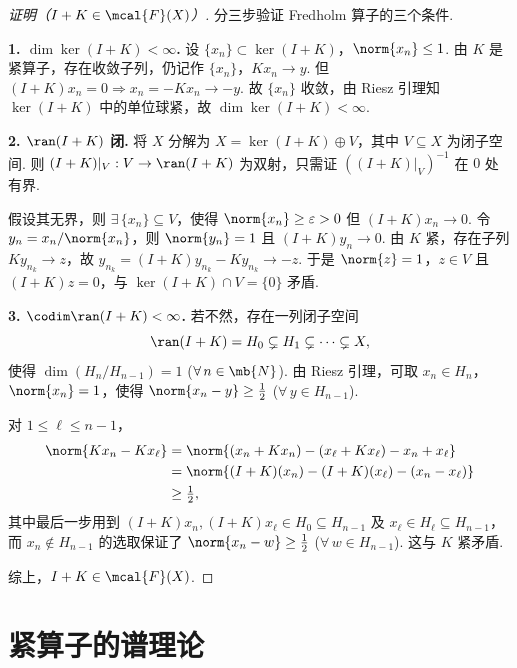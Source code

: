 \begin{proof}[证明（$I+K\in\mcal{F}(X)$）]
分三步验证 Fredholm 算子的三个条件.\par
\textbf{1. $\dim\ker(I+K) < \infty$.} 设 $\{x_n\} \subset \ker(I+K)$，$\norm{x_n}\leq 1$. 由 $K$ 是紧算子，存在收敛子列，仍记作 $\{x_n\}$，$Kx_n \to y$. 但 $(I+K)x_n = 0 \Rightarrow x_n = -Kx_n \to -y$. 故 $\{x_n\}$ 收敛，由 Riesz 引理知 $\ker(I+K)$ 中的单位球紧，故 $\dim\ker(I+K) < \infty$.\par
\textbf{2. $\ran(I+K)$ 闭.} 将 $X$ 分解为 $X = \ker(I+K) \oplus V$，其中 $V \subseteq X$ 为闭子空间. 则 $(I+K)|_V: V \to \ran(I+K)$ 为双射，只需证 $((I+K)|_V)^{-1}$ 在 $0$ 处有界.\par
假设其无界，则 $\exists\,\{x_n\} \subseteq V$，使得 $\norm{x_n} \geq \varepsilon > 0$ 但 $(I+K)x_n \to 0$. 令 $y_n = x_n / \norm{x_n}$，则 $\norm{y_n}=1$ 且 $(I+K)y_n \to 0$. 由 $K$ 紧，存在子列 $Ky_{n_k} \to z$，故 $y_{n_k} = (I+K)y_{n_k} - Ky_{n_k} \to -z$. 于是 $\norm{z}=1$，$z \in V$ 且 $(I+K)z = 0$，与 $\ker(I+K) \cap V = \{0\}$ 矛盾.\par
\textbf{3. $\codim\ran(I+K) < \infty$.} 若不然，存在一列闭子空间
\begin{equation*}
\ran(I+K) = H_0 \subsetneq H_1 \subsetneq \cdots \subsetneq X,
\end{equation*}
使得 $\dim(H_{n}/H_{n-1}) = 1$ ($\forall\, n \in \mb{N}$). 由 Riesz 引理，可取 $x_n \in H_n$，$\norm{x_n}=1$，使得 $\norm{x_n - y} \geq \tfrac{1}{2}$ ($\forall\, y \in H_{n-1}$).\par
对 $1 \leq \ell \leq n-1$，
\begin{align*}
\norm{Kx_n - Kx_\ell}
&= \norm{(x_n+Kx_n) - (x_\ell+Kx_\ell) - x_n + x_\ell}\\
&= \norm{(I+K)(x_n) - (I+K)(x_\ell) - (x_n-x_\ell)}\\
&\geq \tfrac{1}{2},
\end{align*}
其中最后一步用到 $(I+K)x_n, (I+K)x_\ell \in H_0 \subseteq H_{n-1}$ 及 $x_\ell \in H_\ell \subseteq H_{n-1}$，而 $x_n \notin H_{n-1}$ 的选取保证了 $\norm{x_n - w} \geq \tfrac{1}{2}$ ($\forall\, w \in H_{n-1}$). 这与 $K$ 紧矛盾.\par
综上，$I+K \in \mcal{F}(X)$.
\end{proof}

\section{紧算子的谱理论}

